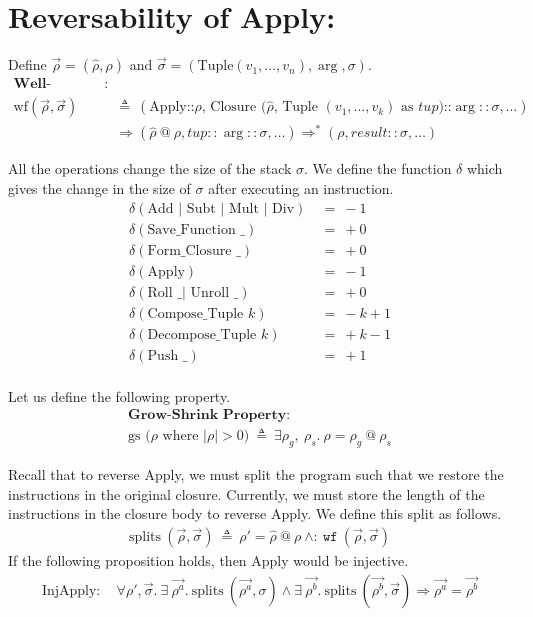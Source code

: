 \documentclass[11pt]{article}
\begin{document}
\section*{Reversability of Apply:}

Define $\vec{\rho} = (\hat{\rho}, \rho)$ and $\vec{\sigma} = (\text{Tuple}(v_1, \dots, v_n), \arg, \sigma)$.
\begin{align*}
    \textbf{Well-Formed Closure Property}: \\
    \text{wf} (\vec{\rho}, \vec{\sigma})\ &\triangleq\ (\text{Apply::$\rho$, Closure ($\hat{\rho}$, Tuple $(v_1, \dots, v_k)$ as $tup$)::$\arg::\sigma, \dots$})\\
    &\Longrightarrow (\hat{\rho}\ @\ \rho, tup::\arg::\sigma, \dots) \Longrightarrow^* (\rho, result::\sigma, \dots)
\end{align*}

All the operations change the size of the stack $\sigma$. We define the function $\delta$ which gives the change in the size of $\sigma$ after executing an instruction.
\begin{align*}
    \delta(\text{Add $|$ Subt $|$ Mult $|$ Div})\ &=\ -1\\
    \delta(\text {Save\_Function \_})\ &=\ +0\\
    \delta(\text {Form\_Closure \_})\ &=\ +0\\
    \delta(\text {Apply})\ &=\ -1\\
    \delta(\text{Roll \_ $|$ Unroll \_})\ &=\ +0\\
    \delta(\text {Compose\_Tuple $k$})\ &=\ -k + 1\\
    \delta(\text {Decompose\_Tuple $k$})\ &=\ +k - 1\\
    \delta(\text {Push \_})\ &=\ +1\\
\end{align*}

Let us define the following property.
\begin{align*}
        \textbf{Grow-Shrink Property}:\\ 
        \text{gs ($\rho$ where $|\rho| > 0$)}\ \triangleq\ \exists \rho_g,\ \rho_s.\ \rho = \rho_g\ @\ \rho_s
\end{align*}

Recall that to reverse Apply, we must split the program such that we restore the instructions in the original closure. Currently, we must store the length of the instructions in the closure body to reverse Apply. We define this split as follows.
\begin{align*}
    \text{splits}\ (\vec{\rho},\vec{\sigma})\ \triangleq\ \rho' = \hat{\rho}\ @\ \rho\ \wedge : \ \texttt{wf}\ (\vec{\rho}, \vec{\sigma})
\end{align*}
If the following proposition holds, then Apply would be injective.
\begin{align*}
    \text{InjApply}: \quad \forall \rho', \vec{\sigma}.\ \exists\ \vec{\rho^a}.\ \text{splits}\ (\vec{\rho^a}, \sigma) \wedge \exists\ \vec{\rho^b}.\ \text{splits}\ (\vec{\rho^b}, \vec{\sigma}) \Longrightarrow \vec{\rho^a} = \vec{\rho^b}
\end{align*}
\end{document}
